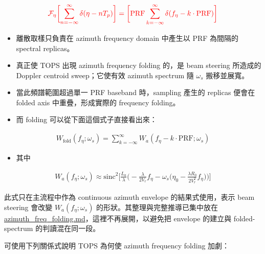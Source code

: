 \documentclass[10pt]{article}
\providecommand{\tightlist}{%
  \setlength{\itemsep}{0pt}\setlength{\parskip}{0pt}}
\begin{document}
\begin{equation}
\begin{aligned}
{\color{red}{\mathcal{F}_{\eta}\biggl[ \sum_{n=-\infty}^{\infty}\delta(\eta-nT_p) \biggr] = 
\biggl[ \mathrm{PRF}\sum_{k=-\infty}^{\infty}\delta(f_\eta-k\cdot\mathrm{PRF}) \biggr]}}
\end{aligned}
\end{equation}

\begin{itemize}
\item
  離散取樣只負責在 azimuth frequency domain 中產生以 PRF 為間隔的
  spectral replicas。
\item
  真正使 TOPS 出現 azimuth frequency folding 的，是 beam steering
  所造成的 Doppler centroid sweep；它使有效 azimuth spectrum 隨
  \(\omega_s\) 搬移並展寬。
\item
  當此頻譜範圍超過單一 PRF baseband 時，sampling 產生的 replicas 便會在
  folded axis 中重疊，形成實際的 frequency folding。
\item
  而 folding 可以從下面這個式子直接看出來：
\end{itemize}

\begin{equation}
\begin{aligned} W_{\mathrm{fold}}(f_\eta;\omega_s) = \sum_{k=-\infty}^{\infty} W_a(f_\eta-k\cdot\mathrm{PRF};\omega_s) \end{aligned}
\end{equation}

\begin{itemize}
\tightlist
\item
  其中
\end{itemize}

\begin{equation}
\begin{aligned}
W_a(f_\eta;\omega_s) \approx \mathrm{sinc}^2\biggl[ \frac{L_a}{\lambda}\biggl( -\frac{\lambda}{2V_r}f_\eta - \omega_s\biggl( \eta_0-\frac{\lambda R_0}{2V_r^2}f_\eta \biggr) \biggr) \biggr]
\end{aligned}
\end{equation}

此式只在主流程中作為 continuous azimuth envelope 的結果式使用，表示 beam
steering 會改變 \(W_a(f_\eta;\omega_s)\)
的形狀。其整理與完整推導已集中放在
\href{./azimuth_freq_folding.md}{azimuth\_freq\_folding.md}，這裡不再展開，以避免把
envelope 的建立與 folded-spectrum 的判讀混在同一段。

可使用下列關係式說明 TOPS 為何使 azimuth frequency folding 加劇：
\end{document}
